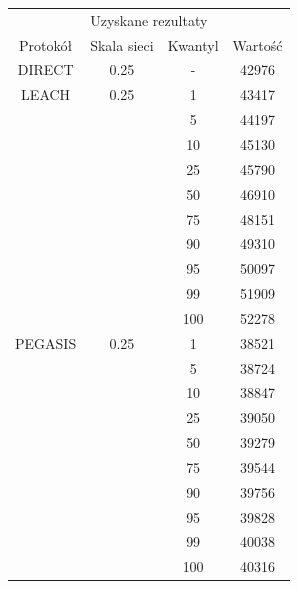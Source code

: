 \documentclass[a4paper,12pt,twoside,openany]{report}
\begin{document}
\begin{longtable}{*{4}{c}}
\toprule
\multicolumn{4}{c}{Uzyskane rezultaty} \\
Protokół	& Skala sieci	& Kwantyl	& Wartość \\
\midrule
\endhead
DIRECT	& 0.25 	& -	& 42976 \\*
\midrule
LEACH	& 0.25	& 1	& 43417 \\*
	&	& 5	& 44197 \\*
	&	& 10	& 45130 \\*
	&	& 25	& 45790 \\*
	&	& 50	& 46910 \\*
	&	& 75	& 48151 \\*
	&	& 90	& 49310 \\*
	&	& 95	& 50097 \\*
	&	& 99	& 51909 \\*
	&	& 100	& 52278 \\*
\midrule
PEGASIS	& 0.25	& 1	& 38521 \\*
	&	& 5	& 38724 \\*
	&	& 10	& 38847 \\*
	&	& 25	& 39050 \\*
	&	& 50	& 39279 \\*
	&	& 75	& 39544 \\*
	&	& 90	& 39756 \\*
	&	& 95	& 39828 \\*
	&	& 99	& 40038 \\*
	&	& 100	& 40316 \\*
\bottomrule
\end{longtable}
\end{document}
